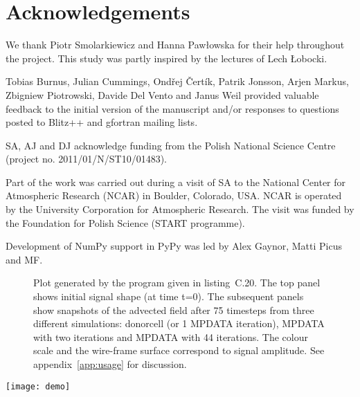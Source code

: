 \documentclass[twocolumn]{article}
\begin{document}
  \footnotesize

  \section*{Acknowledgements}
  {
    We thank Piotr Smolarkiewicz and Hanna Pawłowska for their help throughout the project.
    This study was partly inspired by the lectures of Lech Łobocki.

    Tobias Burnus, Julian Cummings, Ond\v{r}ej \v{C}ert\'ik, Patrik Jonsson,
      Arjen Markus, Zbigniew Piotrowski, Davide Del Vento and Janus Weil 
      provided valuable feedback to the initial version of the
      manuscript and/or responses to questions posted to Blitz++ and gfortran mailing lists.
    
    SA, AJ and DJ acknowledge funding from the Polish National Science Centre
      (project no. 2011/01/N/ST10/01483).

    Part of the work was carried out during a visit of SA to the National
      Center for Atmospheric Research (NCAR) in Boulder, Colorado, USA.
    NCAR is operated by the University Corporation for Atmospheric Research.
    The visit was funded by the Foundation for Polish Science (START programme).
 
    Development of NumPy support in PyPy was led by Alex Gaynor, Matti Picus and MF.
  }

  
  
  
  \begin{figure}[bh!]
    \caption{\label{fig:mpdata}
      Plot generated by the program given in listing~C.20.
      The top panel shows initial signal shape (at time t=0).
      The subsequent panels show snapshots of the advected field after 75 timesteps
        from three different simulations: donorcell (or 1 MPDATA iteration), MPDATA
        with two iterations and MPDATA with 44 iterations.
      The colour scale and the wire-frame surface correspond to signal amplitude.
      See appendix~\ref{app:usage} for discussion.
    }
  \end{figure}
  \texttt{[image: demo]}
\end{document}

